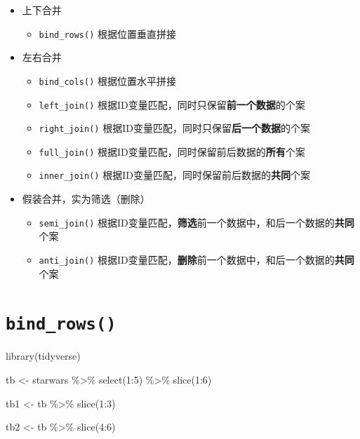 \documentclass[
  letterpaper,
]{ctexbook}
\newenvironment{Shaded}{\begin{snugshade}}{\end{snugshade}}
\newcommand{\DecValTok}[1]{\textcolor[rgb]{0.68,0.00,0.00}{#1}}
\newcommand{\FunctionTok}[1]{\textcolor[rgb]{0.28,0.35,0.67}{#1}}
\newcommand{\NormalTok}[1]{\textcolor[rgb]{0.00,0.23,0.31}{#1}}
\newcommand{\OtherTok}[1]{\textcolor[rgb]{0.00,0.23,0.31}{#1}}
\newcommand{\SpecialCharTok}[1]{\textcolor[rgb]{0.37,0.37,0.37}{#1}}
\providecommand{\tightlist}{%
  \setlength{\itemsep}{0pt}\setlength{\parskip}{0pt}}\usepackage{longtable,booktabs,array}
\begin{document}
\begin{itemize}
\tightlist
\item
  上下合并

  \begin{itemize}
  \tightlist
  \item
    \texttt{bind\_rows()} 根据位置垂直拼接
  \end{itemize}
\item
  左右合并

  \begin{itemize}
  \tightlist
  \item
    \texttt{bind\_cols()} 根据位置水平拼接
  \item
    \texttt{left\_join()}
    根据ID变量匹配，同时只保留{\textbf{前一个数据}}的个案
  \item
    \texttt{right\_join()}
    根据ID变量匹配，同时只保留{\textbf{后一个数据}}的个案
  \item
    \texttt{full\_join()}
    根据ID变量匹配，同时保留前后数据的{\textbf{所有}}个案
  \item
    \texttt{inner\_join()}
    根据ID变量匹配，同时保留前后数据的{\textbf{共同}}个案
  \end{itemize}
\item
  假装合并，实为筛选（删除）

  \begin{itemize}
  \tightlist
  \item
    \texttt{semi\_join()}
    根据ID变量匹配，{\textbf{筛选}}前一个数据中，和后一个数据的{\textbf{共同}}个案
  \item
    \texttt{anti\_join()}
    根据ID变量匹配，{\textbf{删除}}前一个数据中，和后一个数据的{\textbf{共同}}个案
  \end{itemize}
\end{itemize}

\hypertarget{bind_rows}{%
\section{\texorpdfstring{\texttt{bind\_rows()}}{bind\_rows()}}\label{bind_rows}}

\begin{Shaded}
\begin{Highlighting}[]
\FunctionTok{library}\NormalTok{(tidyverse)}

\NormalTok{tb }\OtherTok{\textless{}{-}}\NormalTok{ starwars }\SpecialCharTok{\%\textgreater{}\%}
  \FunctionTok{select}\NormalTok{(}\DecValTok{1}\SpecialCharTok{:}\DecValTok{5}\NormalTok{) }\SpecialCharTok{\%\textgreater{}\%}
  \FunctionTok{slice}\NormalTok{(}\DecValTok{1}\SpecialCharTok{:}\DecValTok{6}\NormalTok{)}

\NormalTok{tb1 }\OtherTok{\textless{}{-}}\NormalTok{ tb }\SpecialCharTok{\%\textgreater{}\%}
  \FunctionTok{slice}\NormalTok{(}\DecValTok{1}\SpecialCharTok{:}\DecValTok{3}\NormalTok{)}

\NormalTok{tb2 }\OtherTok{\textless{}{-}}\NormalTok{ tb }\SpecialCharTok{\%\textgreater{}\%}
  \FunctionTok{slice}\NormalTok{(}\DecValTok{4}\SpecialCharTok{:}\DecValTok{6}\NormalTok{)}
\end{Highlighting}
\end{Shaded}
\end{document}
